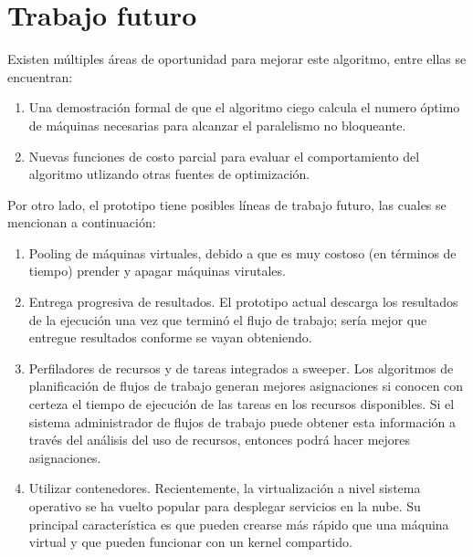 \section{Trabajo futuro}

Existen múltiples áreas de oportunidad para mejorar este algoritmo, entre ellas se encuentran:

\begin{enumerate}
\item{Una demostraci\'on formal de que el algoritmo ciego calcula el numero \'optimo de m\'aquinas necesarias para alcanzar el paralelismo no bloqueante.}
\item{Nuevas funciones de costo parcial para evaluar el comportamiento del algoritmo utlizando otras fuentes de optimizaci\'on.}
\end{enumerate}

Por otro lado, el prototipo tiene posibles l\'ineas de trabajo futuro, las cuales se mencionan a continuaci\'on:

\begin{enumerate}
\item{Pooling de m\'aquinas virtuales, debido a que es muy costoso (en t\'erminos de tiempo) prender y apagar m\'aquinas virutales.}
\item{Entrega progresiva de resultados. El prototipo actual descarga los resultados de la ejecuci\'on una vez que termin\'o el flujo de trabajo; ser\'ia mejor que entregue resultados conforme se vayan obteniendo.}
\item{Perfiladores de recursos y de tareas integrados a sweeper. Los algoritmos de planificación de flujos de trabajo generan mejores asignaciones si conocen con certeza el tiempo de ejecución de las tareas en los recursos disponibles. Si el sistema administrador de flujos de trabajo puede obtener esta información a través del análisis del uso de recursos, entonces podrá hacer mejores asignaciones.}
\item{Utilizar contenedores. Recientemente, la virtualizaci\'on a nivel sistema operativo se ha vuelto popular para desplegar servicios en la nube. Su principal caracter\'istica es que pueden crearse m\'as r\'apido que una m\'aquina virtual y que pueden funcionar con un kernel compartido.}
\end{enumerate}

